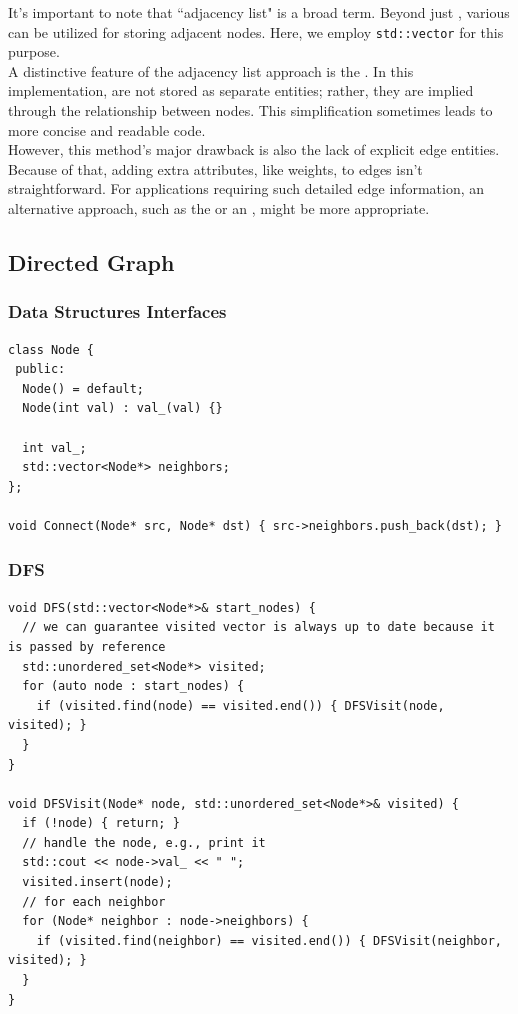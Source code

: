 It's important to note that ``adjacency list" is a broad term. Beyond just {\color{blue}{lists}}, various {\color{blue}{containers}} can be utilized for storing adjacent nodes. Here, we employ {\colorbox{CodeBackground}{\lstinline|std::vector|}} for this purpose. \\

A distinctive feature of the adjacency list approach is the {\color{blue}{implicit edge representation}}. In this implementation, {\color{blue}{edges}} are not stored as separate entities; rather, they are implied through the relationship between nodes. This simplification sometimes leads to more concise and readable code. \\

However, this method's major drawback is also the lack of explicit edge entities. Because of that, adding extra attributes, like weights, to edges isn't straightforward. For applications requiring such detailed edge information, an alternative approach, such as the {\color{blue}{universal implementation}} or an {\color{blue}{adjacency matrix}}, might be more appropriate.

\subsection{Directed Graph}
\subsubsection{Data Structures Interfaces}
\begin{lstlisting}
class Node {
 public:
  Node() = default;
  Node(int val) : val_(val) {}

  int val_;
  std::vector<Node*> neighbors;
};

void Connect(Node* src, Node* dst) { src->neighbors.push_back(dst); }
\end{lstlisting}
\subsubsection{DFS}
\begin{lstlisting}
void DFS(std::vector<Node*>& start_nodes) {
  // we can guarantee visited vector is always up to date because it is passed by reference
  std::unordered_set<Node*> visited;
  for (auto node : start_nodes) {
    if (visited.find(node) == visited.end()) { DFSVisit(node, visited); }
  }
}

void DFSVisit(Node* node, std::unordered_set<Node*>& visited) {
  if (!node) { return; }
  // handle the node, e.g., print it
  std::cout << node->val_ << " ";
  visited.insert(node);
  // for each neighbor
  for (Node* neighbor : node->neighbors) {
    if (visited.find(neighbor) == visited.end()) { DFSVisit(neighbor, visited); }
  }
}
\end{lstlisting}
